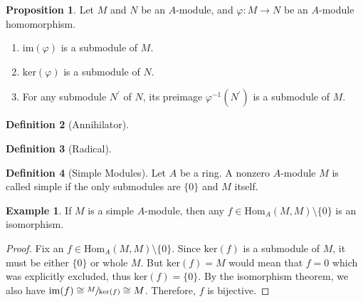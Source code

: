 \documentclass[a4paper]{book}
\theoremstyle{definition}
\newtheorem{definition}{Definition}[]
\newtheorem{example}{Example}[definition]
\newtheorem{proposition}[definition]{Proposition}
\begin{document}
\begin{thmbox}
    \begin{proposition}
        Let \(M\) and \(N\) be an \(A\)-module, and \(\varphi: M \rightarrow N\) be an \(A\)-module homomorphism.
        \begin{enumerate}
            \item \(\mathrm{im}(\varphi)\) is a submodule of \(M\).
            \item \(\mathrm{ker}(\varphi)\) is a submodule of \(N\).
            \item For any submodule \(N^\prime\) of \(N\), its preimage \(\varphi^{-1}(N^\prime)\) is a submodule of \(M\).
        \end{enumerate}
    \end{proposition}
\end{thmbox}

\begin{defbox}
    \begin{definition}[Annihilator]
        
    \end{definition}
\end{defbox}

\begin{defbox}
    \begin{definition}[Radical]
        
    \end{definition}
\end{defbox}

\begin{defbox}
    \begin{definition}[Simple Modules]
        Let \(A\) be a ring. A nonzero \(A\)-module \(M\) is called simple if the only submodules are \(\{0\}\) and \(M\) itself.
    \end{definition}
\end{defbox}

\begin{example}
    If \(M\) is a simple \(A\)-module, then any \(f \in \mathrm{Hom}_A (M, M) \setminus \{0\}\) is an isomorphism.
\end{example}

\begin{proof}
    Fix an \(f \in \mathrm{Hom}_A (M, M) \setminus \{0\}\). Since \(\mathrm{ker}(f)\) is a submodule of \(M\), it must be either \(\{0\}\) or whole \(M\). But \(\mathrm{ker}(f) = M\) would mean that \(f = 0\) which was explicitly excluded, thus \(\mathrm{ker}(f) = \{0\}\). By the isomorphism theorem, we also have \(\mathrm{im}(f) \cong \sfrac{M}{\mathrm{ker}(f)} \cong M\). Therefore, \(f\) is bijective.
\end{proof}
\end{document}
